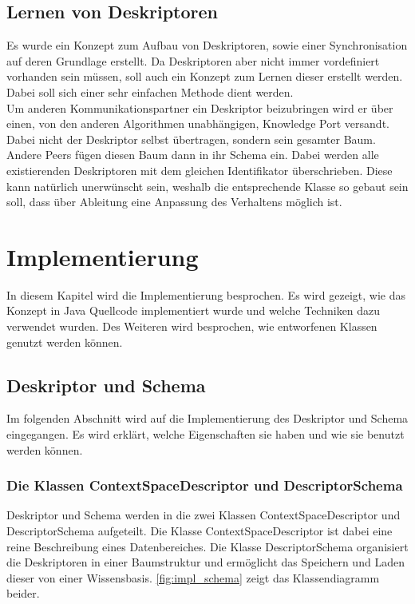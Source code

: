 \documentclass[a4paper]{article}
\begin{document}
	\subsection{Lernen von Deskriptoren}
	
	Es wurde ein Konzept zum Aufbau von Deskriptoren, sowie einer Synchronisation
	auf deren Grundlage erstellt. Da Deskriptoren aber nicht immer vordefiniert
	vorhanden sein müssen, soll auch ein Konzept zum Lernen dieser erstellt werden. 
	Dabei soll sich einer sehr einfachen Methode dient werden. \\
	
	Um anderen Kommunikationspartner ein Deskriptor beizubringen wird er über
	einen, von den anderen Algorithmen unabhängigen, Knowledge Port versandt.
	Dabei nicht der Deskriptor selbst übertragen, sondern sein gesamter Baum.
	Andere Peers fügen diesen Baum dann in ihr Schema ein. Dabei werden alle
	existierenden Deskriptoren mit dem gleichen Identifikator überschrieben. 
	Diese kann natürlich unerwünscht sein, weshalb die entsprechende Klasse
	so gebaut sein soll, dass über Ableitung eine Anpassung des Verhaltens
	möglich ist.
	
	\newpage
	\section{Implementierung}
	
	In diesem Kapitel wird die Implementierung besprochen. Es wird gezeigt, wie
	das Konzept in Java Quellcode implementiert wurde und welche Techniken dazu
	verwendet wurden. Des Weiteren wird besprochen, wie entworfenen Klassen 
	genutzt werden können.
	
	\subsection{Deskriptor und Schema}
	
	Im folgenden Abschnitt wird auf die Implementierung des Deskriptor und Schema
	eingegangen. Es wird erklärt, welche Eigenschaften sie haben und wie sie benutzt
	werden können.
	
	\subsubsection{Die Klassen ContextSpaceDescriptor und DescriptorSchema}
	
	Deskriptor und Schema werden in die zwei Klassen ContextSpaceDescriptor
	und DescriptorSchema aufgeteilt. Die Klasse ContextSpaceDescriptor ist dabei
	eine reine Beschreibung eines Datenbereiches. Die Klasse DescriptorSchema
	organisiert die Deskriptoren in einer Baumstruktur und ermöglicht das
	Speichern und Laden dieser von einer Wissensbasis. \autoref{fig:impl_schema}
	zeigt das Klassendiagramm beider.
	
\end{document}

